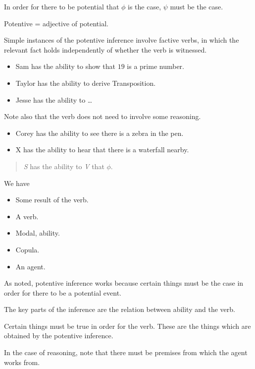 \documentclass[10pt]{article}
\begin{document}
\begin{note}
  In order for there to be potential that \(\phi\) is the case, \(\psi\) must be the case.

  Potentive = adjective of potential.
\end{note}

\begin{note}[Examples]
  Simple instances of the potentive inference involve factive verbs, in which the relevant fact holds independently of whether the verb is witnessed.
  \begin{itemize}
  \item Sam has the ability to show that \(19\) is a prime number.
  \item Taylor has the ability to derive Transposition.
  \item Jesse has the ability to \dots
  \end{itemize}

  Note also that the verb does not need to involve some reasoning.
  \begin{itemize}
  \item Corey has the ability to see there is a zebra in the pen.
  \item X has the ability to hear that there is a waterfall nearby.
  \end{itemize}
\end{note}

\begin{note}
  \begin{quote}
    \emph{S} has the ability to \emph{V} that \(\phi\).
  \end{quote}
  We have
  \begin{itemize}
  \item Some result of the verb.
  \item A verb.
  \item Modal, ability.
  \item Copula.
  \item An agent.
  \end{itemize}
  As noted, potentive inference works because certain things must be the case in order for there to be a potential event.
\end{note}

\begin{note}
  The key parts of the inference are the relation between ability and the verb.

  Certain things must be true in order for the verb.
  These are the things which are obtained by the potentive inference.

  In the case of reasoning, note that there must be premises from which the agent works from.
\end{note}
\end{document}
